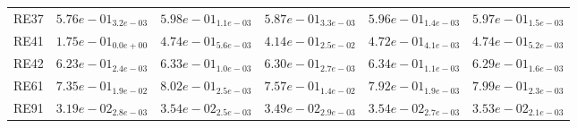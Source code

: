 \documentclass{article}
\begin{document}
\begin{table}
\begin{scriptsize}
\begin{tabular}{llllll}
RE37 & $  5.76e-01_{ 3.2e-03}$ & \cellcolor{gray95}$  5.98e-01_{ 1.1e-03}$ & $  5.87e-01_{ 3.3e-03}$ & $  5.96e-01_{ 1.4e-03}$ & \cellcolor{gray25}$  5.97e-01_{ 1.5e-03}$ \\
RE41 & $  1.75e-01_{ 0.0e+00}$ & \cellcolor{gray95}$  4.74e-01_{ 5.6e-03}$ & $  4.14e-01_{ 2.5e-02}$ & $  4.72e-01_{ 4.1e-03}$ & \cellcolor{gray25}$  4.74e-01_{ 5.2e-03}$ \\
RE42 & $  6.23e-01_{ 2.4e-03}$ & \cellcolor{gray25}$  6.33e-01_{ 1.0e-03}$ & $  6.30e-01_{ 2.7e-03}$ & \cellcolor{gray95}$  6.34e-01_{ 1.1e-03}$ & $  6.29e-01_{ 1.6e-03}$ \\
RE61 & $  7.35e-01_{ 1.9e-02}$ & \cellcolor{gray95}$  8.02e-01_{ 2.5e-03}$ & $  7.57e-01_{ 1.4e-02}$ & $  7.92e-01_{ 1.9e-03}$ & \cellcolor{gray25}$  7.99e-01_{ 2.3e-03}$ \\
RE91 & $  3.19e-02_{ 2.8e-03}$ & \cellcolor{gray95}$  3.54e-02_{ 2.5e-03}$ & $  3.49e-02_{ 2.9e-03}$ & \cellcolor{gray25}$  3.54e-02_{ 2.7e-03}$ & $  3.53e-02_{ 2.1e-03}$ \\
\hline
\end{tabular}
\end{scriptsize}
\end{table}
\end{document}
